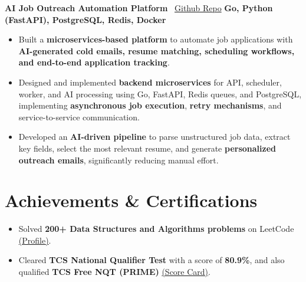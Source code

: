 \documentclass[10pt,a4paper]{article}
\begin{document}
{\textbf{AI Job Outreach Automation Platform}}  \faGithub\ \href{https://github.com/anuragverma57/AI-job-outreach}{Github Repo}
\hfill \textbf{Go, Python (FastAPI), PostgreSQL, Redis, Docker} \\

\vspace{-0.8em}

\begin{itemize}[leftmargin=1.2em]

\item Built a \textbf{microservices-based platform} to automate job applications with \textbf{AI-generated cold emails, resume matching, scheduling workflows, and end-to-end application tracking}.

\item Designed and implemented \textbf{backend microservices} for API, scheduler, worker, and AI processing using Go, FastAPI, Redis queues, and PostgreSQL, implementing \textbf{asynchronous job execution}, \textbf{retry mechanisms}, and service-to-service communication.

\item Developed an \textbf{AI-driven pipeline} to parse unstructured job data, extract key fields, select the most relevant resume, and generate \textbf{personalized outreach emails}, significantly reducing manual effort.

\end{itemize}

\section*{Achievements \& Certifications}
\begin{itemize}[leftmargin=1.2em]
  \item Solved \textbf{200+ Data Structures and Algorithms problems} on LeetCode 
  \href{https://leetcode.com/u/anuragverma57/}{(Profile)}.
  
  \item Cleared \textbf{TCS National Qualifier Test} with a score of \textbf{80.9\%}, and also qualified \textbf{TCS Free NQT (PRIME)} 
  \href{https://drive.google.com/file/d/1PqzZDp53fo6A1livQCjWHCTMALZB1bRa/view?usp=drive_link}{(Score Card)}.
  
  
\end{itemize}
\end{document}
